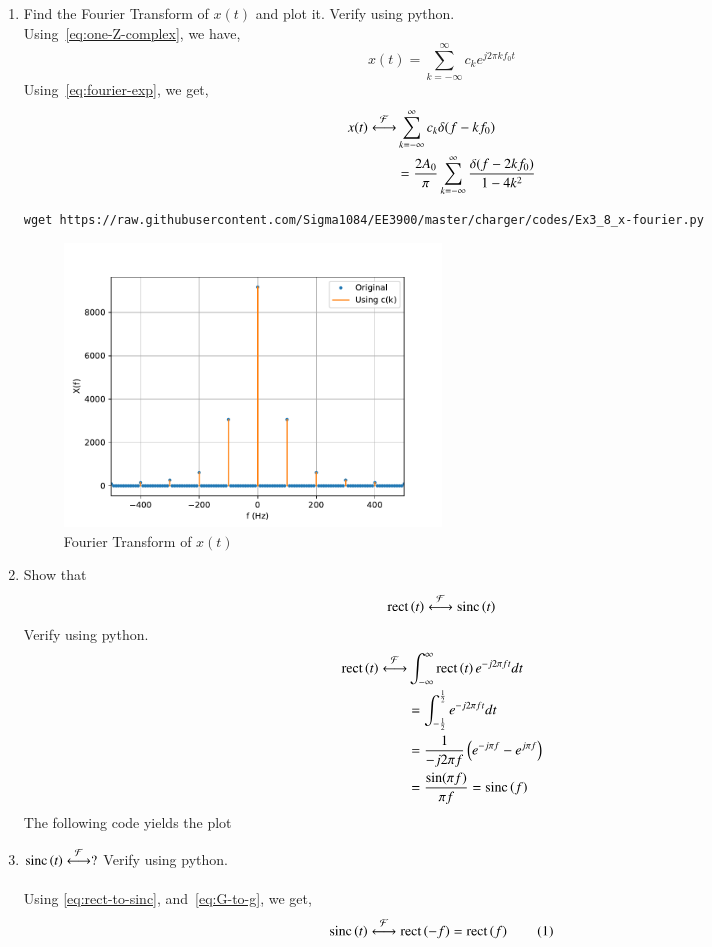 \documentclass[journal,12pt,twocolumn]{IEEEtran}
\renewcommand\thesection{\arabic{section}}
\begin{document}
\begin{enumerate}[label=\thesection.\arabic*, ref=\thesection.\theenumi]
\item Find the Fourier Transform of $x(t)$ and plot it.
	Verify using python. \\
	\solution
	Using~\eqref{eq:one-Z-complex}, we have,
	\[ x(t) = \sum_{k = -\infty}^{\infty}c_k e^{j2\pi kf_0 t} \]
	Using~\eqref{eq:fourier-exp}, we get,
	\begin{align*}
		x(t) \overset{\mathcal{F}}{ \longleftrightarrow} & \sum_{k=-\infty}^\infty c_k \delta(f-kf_0) \\
		&= \frac{2A_0}{\pi} \sum_{k=-\infty}^\infty \frac{\delta(f-2kf_0)}{1-4k^2} \\
	\end{align*}
	\begin{lstlisting}
wget https://raw.githubusercontent.com/Sigma1084/EE3900/master/charger/codes/Ex3_8_x-fourier.py
	\end{lstlisting}
	\begin{figure}[h]
		\centering
		\includegraphics[width=0.5\textwidth]{figs/Ex3_8_verify_xt_fourier}
		\caption{Fourier Transform of $x(t)$}
		\label{fig:verify_xt_fourier}
	\end{figure}
	

\item Show that
	\begin{align}
		\text{rect}\left(t\right) \overset{\mathcal{F}}{ \longleftrightarrow} \text{sinc}\left(t\right)
		\label{eq:rect-to-sinc}
	\end{align}
	Verify using python. \\
	\solution
	\begin{align*}
		\text{rect}\left(t\right) \overset{\mathcal{F}}{ \longleftrightarrow} & \int_{-\infty}^\infty \text{rect}\left(t\right) e^{-j2\pi ft} dt \\
		&= \int_{-\frac{1}{2}}^{\frac{1}{2}} e^{-j2\pi ft} dt \\
		&= \frac{1}{-j2\pi f} \left(e^{-j\pi f} - e^{j\pi f}\right) \\
		&= \frac{\sin(\pi f)}{\pi f} = \text{sinc}\left(f\right)
	\end{align*}
	The following code yields the plot

\item 
	$\text{sinc}\left(t\right)\overset{\mathcal{F}}{ \longleftrightarrow} ?$
	Verify using python. \\
	\solution \\
	Using \eqref{eq:rect-to-sinc}, and~\eqref{eq:G-to-g}, we get,
	\[ \sinc{t} \system{F} \rect{-f} = \rect{f} \numberthis \label{eq:sinc-to-rect} \]


\end{enumerate}
\end{document}
